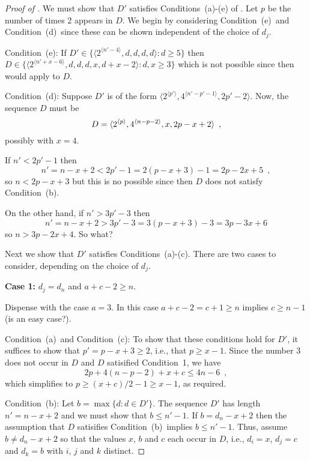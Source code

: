 \documentclass[lotsofwhite,charterfonts]{patmorin}
\newcommand{\rep}[1]{^{\langle#1\rangle}}
\newcommand{\toomuchdetail}[1]{#1}
\newcommand{\degreesum}{Condition~(a)}
\newcommand{\maxdegree}{Condition~(b)}
\newcommand{\twotwos}{Condition~(c)}
\newcommand{\onebig}{Condition~(d)}
\newcommand{\fourds}{Condition~(e)}
\begin{document}
\begin{proof}[Proof of ]

We must show that $D'$ satisfies Conditions~(a)-(e) of .
Let $p$ be the number of times 2 appears in $D$.  We begin by
considering \fourds\ and \onebig\ since these can be shown independent
of the choice of $d_j$.

\noindent\fourds:
If $D'\in \{\langle 2\rep{n'-4},d,d,d,d\rangle : d\ge 5\}$ then
$D\in\{\langle 2\rep{n'+x-6},d,d,d,x,d+x-2\rangle : d,x\ge 3\}$ which
is not possible since then  would apply to $D$.

\noindent\onebig:
Suppose $D'$ is of the form $\langle 2\rep{p'},4\rep{n'-p'-1},
2p'-2\rangle$.   Now, the sequence $D$ must be 
\begin{equation} 
    D=\langle 2\rep{p},4\rep{n-p-2},x,2p-x+2\rangle \enspace , 
		\eqlabel{seq-a}
\end{equation}
possibly with $x=4$.

If $n'< 2p'-1$ then
\[
      n' = n-x+2 < 2p'-1  
         \toomuchdetail{= 2(p-x+3) - 1}
         = 2p-2x + 5 \enspace , 
\]
so $n < 2p-x+3$ but this is no possible since then $D$ does not 
satisfy
\maxdegree.

On the other hand, if $n'>3p' - 3$ then
\[
      n' = n-x+2 > 3p' - 3 
         \toomuchdetail{= 3(p-x+3) - 3}
         = 3p - 3x + 6
\]
so $n > 3p - 2x + 4$.  So what?


Next we show that $D'$ satisfies Conditions~(a)-(c).  There are two
cases to consider, depending on the choice of $d_j$.

\noindent\textbf{Case 1:} $d_j=d_n$ and $a+c-2\ge n$.  

Dispense with the case $a=3$.  In this case $a+c-2=c+1\ge n$ implies $c\ge
n-1$ (is an easy case?). \marginpar{*}

\noindent\degreesum\ and \twotwos:  To show that these conditions hold
for $D'$, it suffices to show that $p'=p-x+3\ge 2$, i.e., that $p\ge
x-1$.  Since the number 3 does not occur in $D$ and $D$ satisified
Condition~1, we have 
\[
             2p+4(n-p-2)+x+c \le 4n-6 \enspace ,
\]
which simplifies to $p\ge (x+c)/2-1\ge x-1$, as required.

\noindent\maxdegree:  Let $b=\max\{d:d\in D'\}$.  The sequence $D'$
has length $n'=n-x+2$ and we must show that $b\le n'-1$.  If
$b=d_n-x+2$ then the assumption that $D$ satisifies \maxdegree\
implies $b\le n'-1$.  Thus, assume $b\neq d_{n}-x+2$ so that the values
$x$, $b$ and $c$ each occur in $D$, i.e., $d_i=x$, $d_j=c$ and $d_k=b$
with $i$, $j$ and $k$ distinct.


\end{proof}
\end{document}
